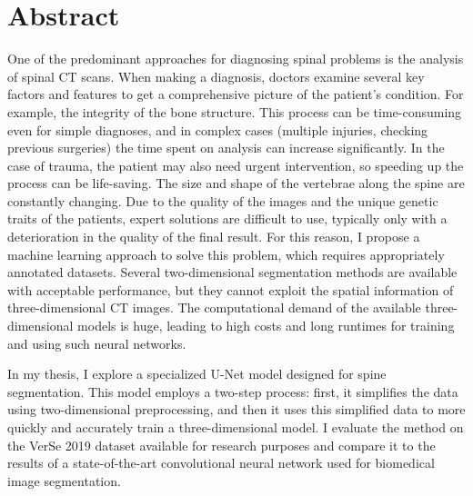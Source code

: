 \chapter*{Abstract}

One of the predominant approaches for diagnosing spinal problems is the analysis of spinal CT scans. When making a diagnosis, doctors examine several key factors and features to get a comprehensive picture of the patient's condition. For example, the integrity of the bone structure. This process can be time-consuming even for simple diagnoses, and in complex cases (multiple injuries, checking previous surgeries) the time spent on analysis can increase significantly. In the case of trauma, the patient may also need urgent intervention, so speeding up the process can be life-saving. 
The size and shape of the vertebrae along the spine are constantly changing. Due to the quality of the images and the unique genetic traits of the patients, expert solutions are difficult to use, typically only with a deterioration in the quality of the final result. For this reason, I propose a machine learning approach to solve this problem, which requires appropriately annotated datasets. 
Several two-dimensional segmentation methods are available with acceptable performance, but they cannot exploit the spatial information of three-dimensional CT images. The computational demand of the available three-dimensional models is huge, leading to high costs and long runtimes for training and using such neural networks.

In my thesis, I explore a specialized U-Net model designed for spine segmentation. This model employs a two-step process: first, it simplifies the data using two-dimensional preprocessing, and then it uses this simplified data to more quickly and accurately train a three-dimensional model. I evaluate the method on the VerSe 2019 dataset available for research purposes and compare it to the results of a state-of-the-art convolutional neural network used for biomedical image segmentation.


\vfill
\cleardoublepage

\selectthesislanguage

\setcounter{romanPage}{\value{page}}
